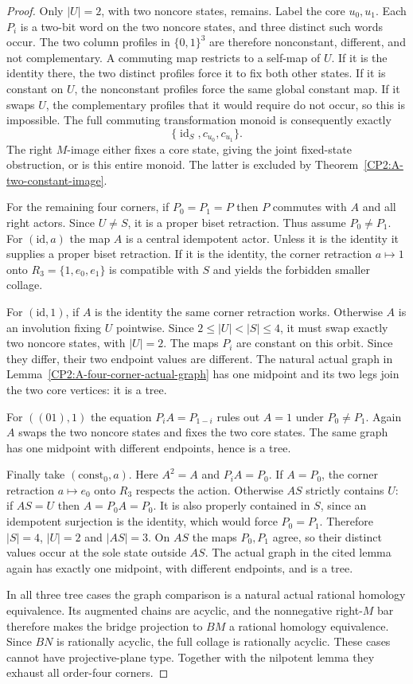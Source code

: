 \begin{proof}
Only $|U|=2$, with two noncore states, remains. Label the
core $u_0,u_1$. Each $P_i$ is a two-bit word on the two
noncore states, and three distinct such words occur.
The two column profiles in $\{0,1\}^3$ are therefore
nonconstant, different, and not complementary. A commuting
map restricts to a self-map of $U$. If it is the identity
there, the two distinct profiles force it to fix both
other states. If it is constant on $U$, the nonconstant
profiles force the same global constant map. If it swaps
$U$, the complementary profiles that it would require
do not occur, so this is impossible. The full commuting
transformation monoid is consequently exactly
\[
 \{\operatorname{id}_S,c_{u_0},c_{u_1}\}.
\]
The right $M$-image either fixes a core state, giving the
joint fixed-state obstruction, or is this entire monoid.
The latter is excluded by
Theorem~\ref{CP2:A-two-constant-image}.

For the remaining four corners, if $P_0=P_1=P$ then
$P$ commutes with $A$ and all right actors. Since $U\ne S$,
it is a proper biset retraction. Thus assume $P_0\ne P_1$.
For $(\mathrm{id},a)$ the map $A$ is a central idempotent
actor. Unless it is the identity it supplies a proper
biset retraction. If it is the identity, the corner
retraction $a\mapsto1$ onto $R_3=\{1,e_0,e_1\}$ is
compatible with $S$ and yields the forbidden smaller
collage.

For $(\mathrm{id},1)$, if $A$ is the identity the same
corner retraction works. Otherwise $A$ is an involution
fixing $U$ pointwise. Since $2\le|U|<|S|\le4$, it must
swap exactly two noncore states, with $|U|=2$. The maps
$P_i$ are constant on this orbit. Since they differ,
their two endpoint values are different. The natural
actual graph in Lemma~\ref{CP2:A-four-corner-actual-graph}
has one midpoint and its two legs join the two core
vertices: it is a tree.

For $((01),1)$ the equation $P_iA=P_{1-i}$ rules out
$A=1$ under $P_0\ne P_1$. Again $A$ swaps the two
noncore states and fixes the two core states. The same
graph has one midpoint with different endpoints, hence
is a tree.

Finally take $(\mathrm{const}_0,a)$. Here $A^2=A$ and
$P_iA=P_0$. If $A=P_0$, the corner retraction
$a\mapsto e_0$ onto $R_3$ respects the action. Otherwise
$AS$ strictly contains $U$: if $AS=U$ then
$A=P_0A=P_0$. It is also properly contained in $S$,
since an idempotent surjection is the identity, which
would force $P_0=P_1$. Therefore $|S|=4$, $|U|=2$ and
$|AS|=3$. On $AS$ the maps $P_0,P_1$ agree, so their
distinct values occur at the sole state outside $AS$.
The actual graph in the cited lemma again has exactly
one midpoint, with different endpoints, and is a tree.

In all three tree cases the graph comparison is a natural
actual rational homology equivalence. Its augmented
chains are acyclic, and the nonnegative right-$M$ bar
therefore makes the bridge projection to $BM$ a rational
homology equivalence. Since $BN$ is rationally acyclic,
the full collage is rationally acyclic. These cases cannot
have projective-plane type. Together with the nilpotent
lemma they exhaust all order-four corners.
\end{proof}

